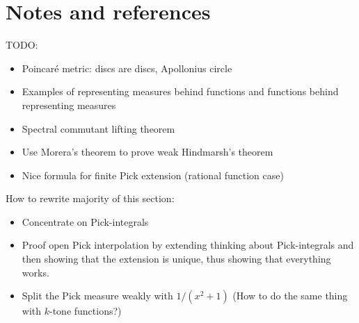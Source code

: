 \section{Notes and references}

TODO:
\begin{itemize}
	\item Poincaré metric: discs are discs, Apollonius circle
	\item Examples of representing measures behind functions and functions behind representing measures
	\item Spectral commutant lifting theorem
	\item Use Morera's theorem to prove weak Hindmarsh's theorem
	\item Nice formula for finite Pick extension (rational function case)
\end{itemize}


How to rewrite majority of this section:
\begin{itemize}
	\item Concentrate on Pick-integrals
	\item Proof open Pick interpolation by extending thinking about Pick-integrals and then showing that the extension is unique, thus showing that everything works.
	\item Split the Pick measure weakly with $1/(x^2 + 1)$ (How to do the same thing with $k$-tone functions?)
\end{itemize}

